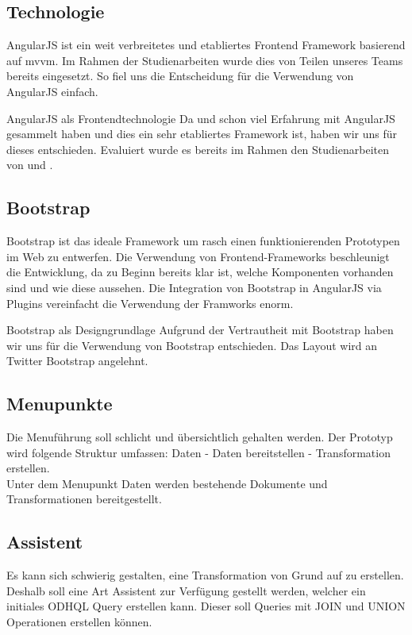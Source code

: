 \subsection{Technologie}
AngularJS ist ein weit verbreitetes und etabliertes Frontend Framework basierend auf \acs{mvvm}. Im Rahmen der Studienarbeiten wurde dies von Teilen unseres Teams bereits eingesetzt. So fiel uns die Entscheidung für die Verwendung von AngularJS einfach.
\begin{decision}[label=dec:frontend:technology]{AngularJS als Frontendtechnologie}
Da \chuf und \fscf schon viel Erfahrung mit AngularJS gesammelt haben und dies ein sehr etabliertes Framework ist, haben wir uns für dieses entschieden. Evaluiert wurde es bereits im Rahmen den Studienarbeiten von \fscf und \rlif.
\end{decision}
\subsection{Bootstrap}
Bootstrap ist das ideale Framework um rasch einen funktionierenden Prototypen im Web zu entwerfen. Die Verwendung von Frontend-Frameworks beschleunigt die Entwicklung, da zu Beginn bereits klar ist, welche Komponenten vorhanden sind und wie diese aussehen. Die Integration von Bootstrap in AngularJS via Plugins vereinfacht die Verwendung der Framworks enorm.
\begin{decision}[label=dec:frontend:bootstrap]{Bootstrap als Designgrundlage}
Aufgrund der Vertrautheit mit Bootstrap haben wir uns für die Verwendung von Bootstrap entschieden. Das Layout wird an Twitter Bootstrap angelehnt.
\end{decision}

\subsection{Menupunkte}
Die Menuführung soll schlicht und übersichtlich gehalten werden. Der Prototyp wird folgende Struktur umfassen: Daten - Daten bereitstellen - Transformation erstellen. \\
Unter dem Menupunkt Daten werden bestehende Dokumente und Transformationen bereitgestellt.\\

\subsection{Assistent}
Es kann sich schwierig gestalten, eine Transformation von Grund auf zu erstellen. Deshalb soll eine Art Assistent zur Verfügung gestellt werden, welcher ein initiales ODHQL Query erstellen kann. Dieser soll Queries mit JOIN und UNION Operationen erstellen können.

